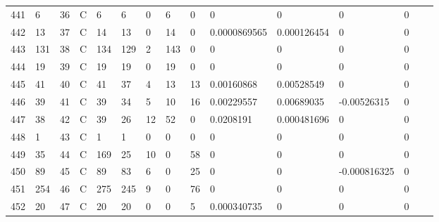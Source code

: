 \begin{longtable}{lllllllllllllll}
	441 & 6                 & 36  & C   & 6                 & 6                 & 0                 & 6    & 0          & 0              & 0              & 0             & 0            \\
	442 & 13                & 37  & C   & 14                & 13                & 0                 & 14   & 0          & 0.0000869565   & 0.000126454    & 0             & 0            \\
	443 & 131               & 38  & C   & 134               & 129               & 2                 & 143  & 0          & 0              & 0              & 0             & 0            \\
	444 & 19                & 39  & C   & 19                & 19                & 0                 & 19   & 0          & 0              & 0              & 0             & 0            \\
	445 & 41                & 40  & C   & 41                & 37                & 4                 & 13   & 13         & 0.00160868     & 0.00528549     & 0             & 0            \\
	446 & 39                & 41  & C   & 39                & 34                & 5                 & 10   & 16         & 0.00229557     & 0.00689035     & -0.00526315   & 0            \\
	447 & 38                & 42  & C   & 39                & 26                & 12                & 52   & 0          & 0.0208191      & 0.000481696    & 0             & 0            \\
	448 & 1                 & 43  & C   & 1                 & 1                 & 0                 & 0    & 0          & 0              & 0              & 0             & 0            \\
	449 & 35                & 44  & C   & 169               & 25                & 10                & 0    & 58         & 0              & 0              & 0             & 0            \\
	450 & 89                & 45  & C   & 89                & 83                & 6                 & 0    & 25         & 0              & 0              & -0.000816325  & 0            \\
	451 & 254               & 46  & C   & 275               & 245               & 9                 & 0    & 76         & 0              & 0              & 0             & 0            \\
	452 & 20                & 47  & C   & 20                & 20                & 0                 & 0    & 5          & 0.000340735    & 0              & 0             & 0            \\

\end{longtable}
